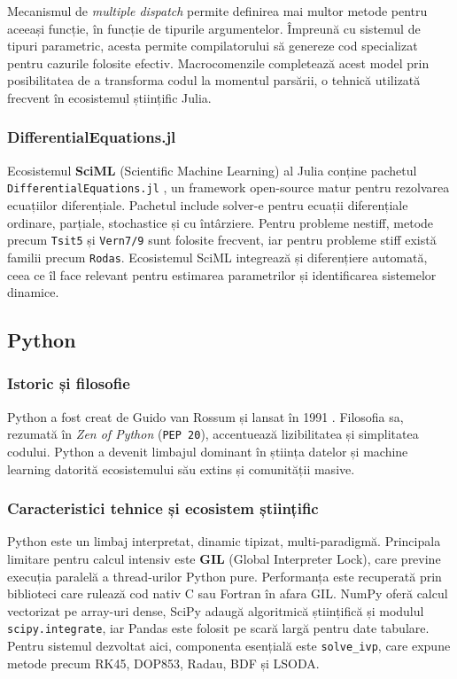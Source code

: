 Mecanismul de \emph{multiple dispatch} permite definirea mai multor metode pentru
aceeași funcție, în funcție de tipurile argumentelor. Împreună cu sistemul de tipuri
parametric, acesta permite compilatorului să genereze cod specializat pentru cazurile
folosite efectiv. Macrocomenzile completează acest model prin posibilitatea de a
transforma codul la momentul parsării, o tehnică utilizată frecvent în ecosistemul
științific Julia.

\subsubsection{DifferentialEquations.jl}

Ecosistemul \textbf{SciML} (Scientific Machine Learning) al Julia conține
pachetul \texttt{DifferentialEquations.jl} \cite{rackauckas2017diffeq}, un
framework open-source matur pentru rezolvarea ecuațiilor diferențiale.
Pachetul include solver-e pentru ecuații diferențiale ordinare, parțiale,
stochastice și cu întârziere. Pentru probleme nestiff, metode precum
\texttt{Tsit5} și \texttt{Vern7/9} sunt folosite frecvent, iar pentru probleme
stiff există familii precum \texttt{Rodas}. Ecosistemul SciML integrează și
diferențiere automată, ceea ce îl face relevant pentru estimarea parametrilor și
identificarea sistemelor dinamice.

\subsection{Python}
\label{subsec:python}

\subsubsection{Istoric și filosofie}

Python a fost creat de Guido van Rossum și lansat în 1991 \cite{vanrossum2009python}.
Filosofia sa, rezumată în \emph{Zen of Python} (\texttt{PEP 20}), accentuează
lizibilitatea și simplitatea codului. Python a devenit limbajul dominant în
știința datelor și machine learning datorită ecosistemului său extins și
comunității masive.

\subsubsection{Caracteristici tehnice și ecosistem științific}

Python este un limbaj interpretat, dinamic tipizat, multi-paradigmă. Principala
limitare pentru calcul intensiv este \textbf{GIL} (Global Interpreter Lock),
care previne execuția paralelă a thread-urilor Python pure. Performanța este
recuperată prin biblioteci care rulează cod nativ C sau Fortran în afara GIL.
NumPy oferă calcul vectorizat pe array-uri dense, SciPy
\cite{virtanen2020scipy} adaugă algoritmică științifică și modulul
\texttt{scipy.integrate}, iar Pandas este folosit pe scară largă pentru date
tabulare. Pentru sistemul dezvoltat aici, componenta esențială este
\texttt{solve\_ivp}, care expune metode precum RK45, DOP853, Radau, BDF și LSODA.

